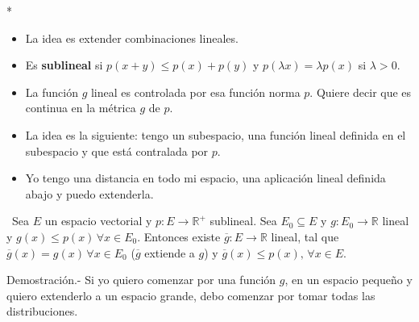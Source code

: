 \begin{paracol}{2}
\switchcolumn[1]*{\noindent\scriptsize
\begin{itemize}
    \item La idea es extender combinaciones lineales.
    \item Es \textbf{sublineal} si $p(x+y)\leq p(x)+p(y)$ y $p(\lambda x)=\lambda p(x)$ si $\lambda>0$.
    \item La función $g$ lineal es controlada por esa función norma $p$. Quiere decir que es continua en la métrica $g$ de $p$. 
    \item La idea es la siguiente: tengo un subespacio, una función lineal definida en el subespacio y que está contralada por $p$.
    \item Yo tengo una distancia en todo mi espacio, una aplicación lineal definida abajo y puedo extenderla.
\end{itemize}
}
\switchcolumn[0]\noindent
\begin{teo}\,
    Sea $E$ un espacio vectorial y $p:E\to \mathbb{R}^+$ sublineal. Sea $E_0\subseteq E$ y $g:E_0\to \mathbb{R}$ lineal y $g(x)\leq p(x)\,\forall x\in E_0$. Entonces existe $\overline{g}:E\to \mathbb{R}$ lineal, tal que $\overline{g}(x)=g(x)\,\forall x\in E_0$ ($\overline{g}$ extiende a $g$) y $\overline{g}(x)\leq p(x),\, \forall x\in E$.

	Demostración.-\; Si yo quiero comenzar por una función $g$, en un espacio pequeño y quiero extenderlo a un espacio grande, debo comenzar por tomar todas las distribuciones.


\end{teo}
\end{paracol}

